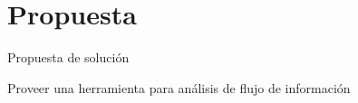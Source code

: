  \section{Propuesta}
	
\begin{frame}{Propuesta de solución}
	\begin{block}{}
	Proveer una herramienta para análisis de flujo de información
	\end{block}
\end{frame}